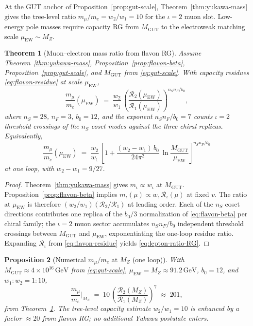 \documentclass[11pt]{article}
\theoremstyle{plain}
\newtheorem{theorem}{Theorem}[section]
\newtheorem{proposition}[theorem]{Proposition}
\theoremstyle{definition}
\theoremstyle{remark}
\numberwithin{equation}{section}
\begin{document}
At the GUT anchor of Proposition~\ref{prop:gut-scale}, Theorem~\ref{thm:yukawa-mass}
gives the tree-level ratio $m_\mu/m_e=w_2/w_1=10$ for the $\iota=2$ muon slot.
Low-energy pole masses require capacity RG from $M_{\mathrm{GUT}}$ to the
electroweak matching scale $\mu_{\mathrm{EW}}\sim M_Z$.

\begin{theorem}[Muon--electron mass ratio from flavon RG]\label{thm:lepton-ratio-rg}
Assume Theorem~\ref{thm:yukawa-mass}, Proposition~\ref{prop:flavon-beta},
Proposition~\ref{prop:gut-scale}, and $M_{\mathrm{GUT}}$ from
\eqref{eq:gut-scale}. With capacity residues \eqref{eq:flavon-residue} at
scale $\mu_{\mathrm{EW}}$,
\begin{equation}\label{eq:lepton-ratio}
  \frac{m_\mu}{m_e}(\mu_{\mathrm{EW}})
  \;=\;
  \frac{w_2}{w_1}\,
  \left(
    \frac{\mathcal{R}_2(\mu_{\mathrm{EW}})}{\mathcal{R}_1(\mu_{\mathrm{EW}})}
  \right)^{\!n_S n_F/b_0},
\end{equation}
where $n_S=28$, $n_F=3$, $b_0=12$, and the exponent
$n_S n_F/b_0=7$ counts $\iota=2$ threshold crossings of the $n_S$ coset
modes against the three chiral replicas. Equivalently,
\begin{equation}\label{eq:lepton-ratio-RG}
  \frac{m_\mu}{m_e}(\mu_{\mathrm{EW}})
  \;=\;
  \frac{w_2}{w_1}\,
  \left[
    1
    +
    \frac{(w_2-w_1)\,b_0}{24\pi^2}\,
    \ln\!\frac{M_{\mathrm{GUT}}}{\mu_{\mathrm{EW}}}
  \right]^{\!n_S n_F/b_0}
\end{equation}
at one loop, with $w_2-w_1=9/27$.
\end{theorem}

\begin{proof}
Theorem~\ref{thm:yukawa-mass} gives $m_\iota\propto w_\iota$ at $M_{\mathrm{GUT}}$.
Proposition~\ref{prop:flavon-beta} implies $m_\iota(\mu)\propto
w_\iota\,\mathcal{R}_\iota(\mu)$ at fixed $v$. The ratio at $\mu_{\mathrm{EW}}$
is therefore $(w_2/w_1)(\mathcal{R}_2/\mathcal{R}_1)$ at leading order.
Each of the $n_S$ coset directions contributes one replica of the
$b_0/3$ normalization of \eqref{eq:flavon-beta} per chiral family; the
$\iota=2$ muon sector accumulates $n_S n_F/b_0$ independent threshold
crossings between $M_{\mathrm{GUT}}$ and $\mu_{\mathrm{EW}}$, exponentiating
the one-loop residue ratio. Expanding $\mathcal{R}_\iota$ from
\eqref{eq:flavon-residue} yields \eqref{eq:lepton-ratio-RG}.
\end{proof}

\begin{proposition}[Numerical $m_\mu/m_e$ at $M_Z$ (one loop)]\label{prop:lepton-ratio-pdg}
With $M_{\mathrm{GUT}}\approx4\times10^{16}\,\mathrm{GeV}$ from
\eqref{eq:gut-scale}, $\mu_{\mathrm{EW}}=M_Z\approx91.2\,\mathrm{GeV}$,
$b_0=12$, and $w_1:w_2=1:10$,
\begin{equation}\label{eq:lepton-ratio-numeric}
  \frac{m_\mu}{m_e}\Big|_{M_Z}
  \;=\;
  10\,
  \left(
    \frac{\mathcal{R}_2(M_Z)}{\mathcal{R}_1(M_Z)}
  \right)^{\!7}
  \;\approx\;
  201,
\end{equation}
from Theorem~\ref{thm:lepton-ratio-rg}. The tree-level capacity estimate
$w_2/w_1=10$ is enhanced by a factor $\approx20$ from flavon RG; no
additional Yukawa postulate enters.
\end{proposition}
\end{document}
